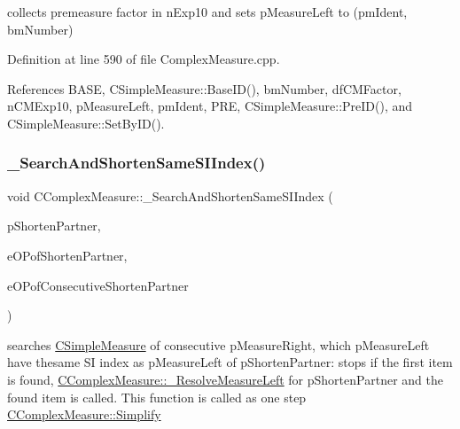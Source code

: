 collects premeasure factor in n\+Exp10 and sets p\+Measure\+Left to (pm\+Ident, bm\+Number) 



Definition at line 590 of file Complex\+Measure.\+cpp.



References B\+A\+SE, C\+Simple\+Measure\+::\+Base\+I\+D(), bm\+Number, df\+C\+M\+Factor, n\+C\+M\+Exp10, p\+Measure\+Left, pm\+Ident, P\+RE, C\+Simple\+Measure\+::\+Pre\+I\+D(), and C\+Simple\+Measure\+::\+Set\+By\+I\+D().

\mbox{\label{classCComplexMeasure_ac9bdfda3d2175532ba7e1f425e6b23b1}} 
\subsubsection{\texorpdfstring{\+\_\+\+Search\+And\+Shorten\+Same\+S\+I\+Index()}{\_SearchAndShortenSameSIIndex()}}
{\footnotesize\ttfamily void C\+Complex\+Measure\+::\+\_\+\+Search\+And\+Shorten\+Same\+S\+I\+Index (\begin{DoxyParamCaption}\item[{\hyperlink{classCComplexMeasure}{C\+Complex\+Measure} $\ast$}]{p\+Shorten\+Partner,  }\item[{\hyperlink{MeasureOperator_8h_a1431c79e3ad4b4c5bcc9f31f188538f2}{e\+Operation} \&}]{e\+O\+Pof\+Shorten\+Partner,  }\item[{\hyperlink{MeasureOperator_8h_a1431c79e3ad4b4c5bcc9f31f188538f2}{e\+Operation} \&}]{e\+O\+Pof\+Consecutive\+Shorten\+Partner }\end{DoxyParamCaption})\hspace{0.3cm}{\ttfamily [protected]}}



searches \hyperlink{classCSimpleMeasure}{C\+Simple\+Measure} of consecutive p\+Measure\+Right, which p\+Measure\+Left have thesame SI index as p\+Measure\+Left of p\+Shorten\+Partner\+: stops if the first item is found, \hyperlink{classCComplexMeasure_a8f642a3a0044d4dc0492774bca8666e9}{C\+Complex\+Measure\+::\+\_\+\+Resolve\+Measure\+Left} for p\+Shorten\+Partner and the found item is called. This function is called as one step \hyperlink{classCComplexMeasure_addb4e69033f2c32fb3bf4a3aef5e1470}{C\+Complex\+Measure\+::\+Simplify} 


